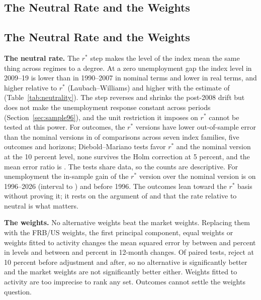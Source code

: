 \documentclass[11pt]{article}
\newcommand{\rs}{r^{*}}
\begin{document}
\begin{appendices}



\section{The Neutral Rate and the Weights}\label{app:neutral}
\subsection{The Neutral Rate and the Weights}\label{sec:rstarweights}
\textbf{The neutral rate.} The $\rs$ step makes the level of the index mean the same thing across regimes to a degree. At a zero unemployment gap the index level in 2009--19 is  lower than in 1990--2007 in nominal terms and  lower in real terms, and  higher relative to $\rs$ (Laubach--Williams) and  higher with the estimate of \citet{kiley2020} (Table~\ref{tab:neutrality}). The step reverses and shrinks the post-2008 drift but does not make the unemployment response constant across periods (Section~\ref{sec:sample96}), and the unit restriction it imposes on $\rs$ cannot be tested at this power. For outcomes, the $\rs$ versions have lower out-of-sample error than the nominal versions in  of  comparisons across seven index families, five outcomes and horizons;  Diebold--Mariano tests favor $\rs$ and  the nominal version at the 10 percent level, none survives the Holm correction at 5 percent, and the mean error ratio is . The tests share data, so the counts are descriptive. For unemployment the in-sample gain of the $\rs$ version over the nominal version is  on 1996--2026 (interval  to ) and  before 1996. The outcomes lean toward the $\rs$ basis without proving it; it rests on the argument of \citet{dudley2010} and \citet{caballero2026} that the rate relative to neutral is what matters.



\textbf{The weights.} No alternative weights beat the market weights. Replacing them with the FRB/US weights, the first principal component, equal weights or weights fitted to activity changes the mean squared error by between  and  percent in levels and between  and  percent in 12-month changes. Of  paired tests,  reject at 10 percent before adjustment and  after, so no alternative is significantly better and the market weights are not significantly better either. Weights fitted to activity are too imprecise to rank any set. Outcomes cannot settle the weights question.
\FloatBarrier


\end{appendices}
\end{document}
